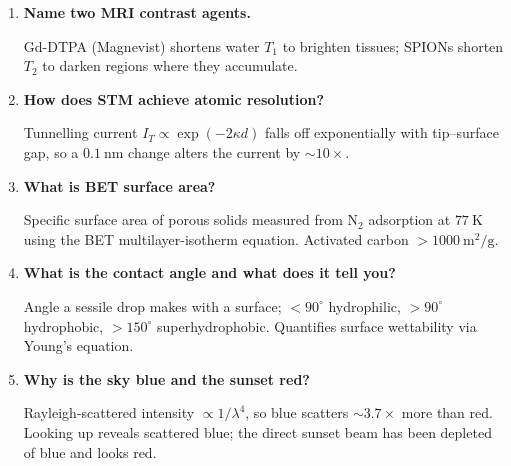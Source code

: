 \documentclass[12pt,a4paper]{article}
\newcommand{\Q}[1]{\textbf{#1}\par\noindent\ignorespaces}
\begin{document}
\begin{tcolorbox}[exambox, title={Frequently Asked / Viva Questions}]
\begin{enumerate}[topsep=0pt, label=\textbf{Q\arabic*.}, itemsep=5pt]
    Spacing within a multiplet, expressed in Hz, independent of $B_0$. It is read directly from line spacing in the spectrum and is diagnostic of cis/trans, geminal/vicinal coupling.
  \item \Q{Name two MRI contrast agents.}
    Gd-DTPA (Magnevist) shortens water $T_1$ to brighten tissues; SPIONs shorten $T_2$ to darken regions where they accumulate.
  \item \Q{How does STM achieve atomic resolution?}
    Tunnelling current $I_T\propto \exp(-2\kappa d)$ falls off exponentially with tip--surface gap, so a $0.1\ \mathrm{nm}$ change alters the current by $\sim 10\times$.
  \item \Q{What is BET surface area?}
    Specific surface area of porous solids measured from $\mathrm{N_2}$ adsorption at $77\ \mathrm{K}$ using the BET multilayer-isotherm equation. Activated carbon $>1000\ \mathrm{m^{2}/g}$.
  \item \Q{What is the contact angle and what does it tell you?}
    Angle a sessile drop makes with a surface; $<90^\circ$ hydrophilic, $>90^\circ$ hydrophobic, $>150^\circ$ superhydrophobic. Quantifies surface wettability via Young's equation.
  \item \Q{Why is the sky blue and the sunset red?}
    Rayleigh-scattered intensity $\propto 1/\lambda^{4}$, so blue scatters $\sim 3.7\times$ more than red. Looking up reveals scattered blue; the direct sunset beam has been depleted of blue and looks red.
\end{enumerate}
\end{tcolorbox}
\end{document}
